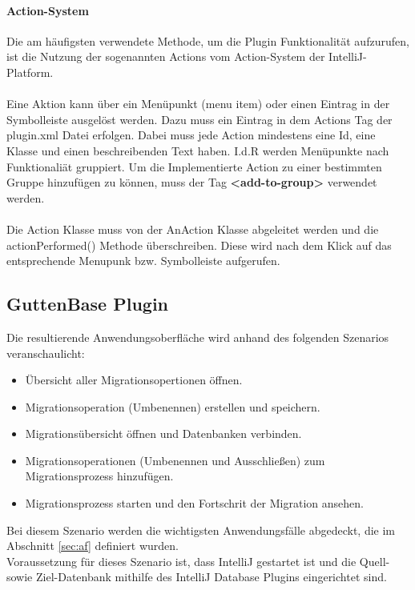 \paragraph{Action-System}
Die am häufigsten verwendete Methode, um die Plugin Funktionalität aufzurufen, ist die Nutzung der sogenannten Actions vom Action-System der IntelliJ-Platform.\\ \\
Eine Aktion kann über ein Menüpunkt (menu item) oder einen Eintrag in der Symbolleiste ausgelöst werden. Dazu muss ein Eintrag in dem Actions Tag der plugin.xml Datei erfolgen. Dabei muss jede Action mindestens eine Id, eine Klasse und einen beschreibenden Text haben. I.d.R werden Menüpunkte nach Funktionaliät gruppiert. Um die Implementierte Action zu einer bestimmten Gruppe hinzufügen zu können, muss der Tag \textbf{<add-to-group>} verwendet werden.\\ \\
Die Action Klasse muss von der AnAction Klasse abgeleitet werden und die actionPerformed() Methode überschreiben. Diese wird nach dem Klick auf das entsprechende Menupunk bzw. Symbolleiste aufgerufen.




\subsection{GuttenBase Plugin}
Die resultierende Anwendungsoberfläche wird anhand des folgenden Szenarios veranschaulicht:
\begin{itemize}
	\item Übersicht aller Migrationsopertionen öffnen.
	\item Migrationsoperation (Umbenennen) erstellen und speichern.
	\item Migrationsübersicht öffnen und Datenbanken verbinden.
	\item Migrationsoperationen (Umbenennen und Ausschließen) zum Migrationsprozess hinzufügen.
	\item Migrationsprozess starten und den Fortschrit der Migration ansehen.
\end{itemize}
Bei diesem Szenario werden die wichtigsten Anwendungsfälle abgedeckt, die im Abschnitt \ref{sec:af} definiert wurden.\\
Voraussetzung für dieses Szenario ist, dass IntelliJ gestartet ist und die Quell- sowie Ziel-Datenbank mithilfe des IntelliJ Database Plugins eingerichtet sind.
